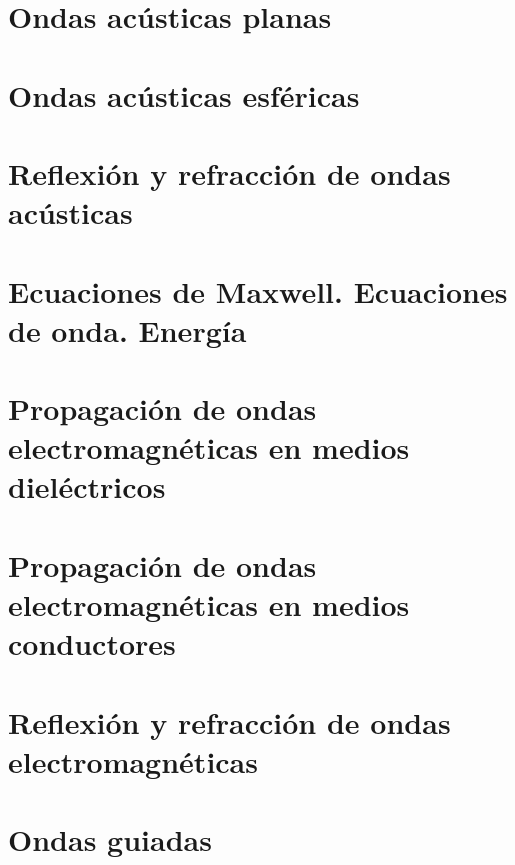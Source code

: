 \documentclass[12pt, a4paper]{article}
\begin{document}
\section{Ondas acústicas planas}
\section{Ondas acústicas esféricas}
\section{Reflexión y refracción de ondas acústicas}
\section{Ecuaciones de Maxwell. Ecuaciones de onda. Energía}
\section{Propagación de ondas electromagnéticas en medios dieléctricos}
\section{Propagación de ondas electromagnéticas en medios conductores}
\section{Reflexión y refracción de ondas electromagnéticas}
\section{Ondas guiadas}
\end{document}
